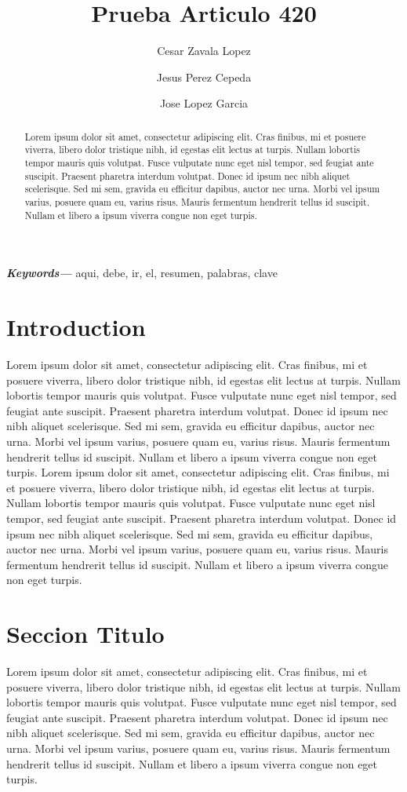 \documentclass{article}
\date{}
\title{Prueba Articulo 420}
\author[1,*]{Cesar Zavala Lopez \orcidlink{0000-0003-1044-2710}}
\author[2]{Jesus Perez Cepeda \orcidlink{0003-0000-1044-2710}}
\author[3]{Jose Lopez Garcia \orcidlink{0003-1044-4209-2710}}
\affil[1]{Departamento De Tecnologias, Upv, Calle Alamo}
\affil[2]{Departamento De Ciencia, Upv, Calle Alamo}
\affil[3]{Departamento De Ciencia, Uvm, Calle Sexta}
\providecommand{\keywords}[1]
{
  \small  
  \textbf{\textit{Keywords---}} #1
}
\begin{document}
\maketitle

\begin{abstract}
Lorem ipsum dolor sit amet, consectetur adipiscing elit. Cras finibus, mi et posuere viverra, libero dolor tristique nibh, id egestas elit lectus at turpis. Nullam lobortis tempor mauris quis volutpat. Fusce vulputate nunc eget nisl tempor, sed feugiat ante suscipit. Praesent pharetra interdum volutpat. Donec id ipsum nec nibh aliquet scelerisque. Sed mi sem, gravida eu efficitur dapibus, auctor nec urna. Morbi vel ipsum varius, posuere quam eu, varius risus. Mauris fermentum hendrerit tellus id suscipit. Nullam et libero a ipsum viverra congue non eget turpis.
\end{abstract}

\keywords{aqui, debe, ir, el, resumen, palabras, clave}

\section{Introduction}
Lorem ipsum dolor sit amet, consectetur adipiscing elit. Cras finibus, mi et posuere viverra, libero dolor tristique nibh, id egestas elit lectus at turpis. Nullam lobortis tempor mauris quis volutpat. Fusce vulputate nunc eget nisl tempor, sed feugiat ante suscipit. Praesent pharetra interdum volutpat. Donec id ipsum nec nibh aliquet scelerisque. Sed mi sem, gravida eu efficitur dapibus, auctor nec urna. Morbi vel ipsum varius, posuere quam eu, varius risus. Mauris fermentum hendrerit tellus id suscipit. Nullam et libero a ipsum viverra congue non eget turpis. Lorem ipsum dolor sit amet, consectetur adipiscing elit. Cras finibus, mi et posuere viverra, libero dolor tristique nibh, id egestas elit lectus at turpis. Nullam lobortis tempor mauris quis volutpat. Fusce vulputate nunc eget nisl tempor, sed feugiat ante suscipit. Praesent pharetra interdum volutpat. Donec id ipsum nec nibh aliquet scelerisque. Sed mi sem, gravida eu efficitur dapibus, auctor nec urna. Morbi vel ipsum varius, posuere quam eu, varius risus. Mauris fermentum hendrerit tellus id suscipit. Nullam et libero a ipsum viverra congue non eget turpis.

\section{Seccion Titulo}
Lorem ipsum dolor sit amet, consectetur adipiscing elit. Cras finibus, mi et posuere viverra, libero dolor tristique nibh, id egestas elit lectus at turpis. Nullam lobortis tempor mauris quis volutpat. Fusce vulputate nunc eget nisl tempor, sed feugiat ante suscipit. Praesent pharetra interdum volutpat. Donec id ipsum nec nibh aliquet scelerisque. Sed mi sem, gravida eu efficitur dapibus, auctor nec urna. Morbi vel ipsum varius, posuere quam eu, varius risus. Mauris fermentum hendrerit tellus id suscipit. Nullam et libero a ipsum viverra congue non eget turpis.
\end{document}
